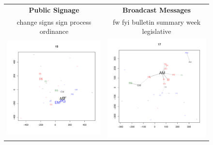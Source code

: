 \begin{figure}[t]
\begin{minipage}[b]{0.5\linewidth}
\centering
\begin{tabular}{cc}
{\bf Public Signage} &
{\bf Broadcast Messages}\\
{\small change signs sign process ordinance}  &
{\small fw fyi bulletin summary week legislative} \\
\includegraphics[scale=.29, trim=.4in .6in .4in .8in, clip=true]{latent_space_15} &
\includegraphics[scale=.29, trim=.4in .6in .4in .8in, clip=true]{latent_space_17} \\

\end{tabular}
\end{minipage}
\end{figure}
